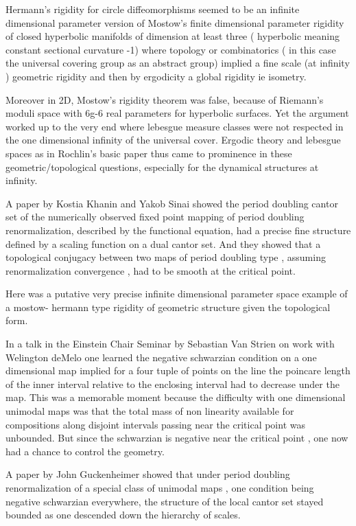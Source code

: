 \begin{description}
Hermann's rigidity for circle diffeomorphisms   seemed to be  an infinite dimensional  parameter  version  of  Mostow's finite dimensional  parameter  rigidity of closed hyperbolic manifolds of dimension  at least three ( hyperbolic meaning constant sectional curvature -1)  where topology or combinatorics ( in this case the universal covering group as an abstract group)  implied a fine scale (at infinity ) geometric  rigidity and then by ergodicity a global rigidity ie isometry.

Moreover in 2D,  Mostow's  rigidity theorem  was false, because of Riemann's moduli space with  6g-6 real parameters for hyperbolic surfaces.  Yet  the argument worked up to the very end where lebesgue measure classes were not respected in the one dimensional infinity of the universal cover.  Ergodic theory  and lebesgue spaces as in Rochlin's  basic paper   thus came to prominence in these geometric/topological questions, especially  for  the dynamical structures at infinity.

  A paper by   Kostia Khanin and Yakob Sinai  showed the period doubling cantor set of the numerically observed fixed point mapping  of period doubling renormalization, described by the functional equation,  had a precise fine structure defined by a scaling function on a dual cantor set. And they showed  that a  topological conjugacy between two maps of period doubling type , assuming renormalization convergence , had to be smooth at the critical point.

Here was  a  putative  very precise  infinite dimensional parameter space  example of  a mostow- hermann type rigidity of geometric structure given the topological form.


In a talk in the Einstein Chair Seminar by  Sebastian Van Strien on work with  Welington deMelo  one  learned the negative schwarzian condition on a one dimensional map  implied for a four tuple of points on the line the poincare length of the inner interval relative to the enclosing interval  had to decrease under the map.  This was a memorable moment because the difficulty with one dimensional unimodal maps was  that the  total mass of non linearity available  for compositions along disjoint intervals  passing near the critical point was unbounded. But since the  schwarzian is negative near the critical point , one  now had  a chance to control the geometry.

 A  paper by John Guckenheimer showed that  under  period doubling renormalization of a special class of unimodal maps ,  one condition being negative schwarzian everywhere, the structure of the local cantor set stayed  bounded as one descended down the hierarchy of scales.


\end{description}
